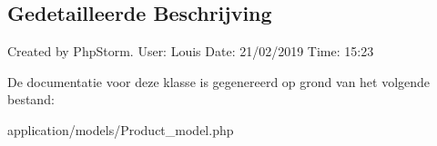 \subsection{Gedetailleerde Beschrijving}
Created by Php\+Storm. User\+: Louis Date\+: 21/02/2019 Time\+: 15\+:23 

De documentatie voor deze klasse is gegenereerd op grond van het volgende bestand\+:\begin{DoxyCompactItemize}
\item 
application/models/Product\+\_\+model.\+php\end{DoxyCompactItemize}
